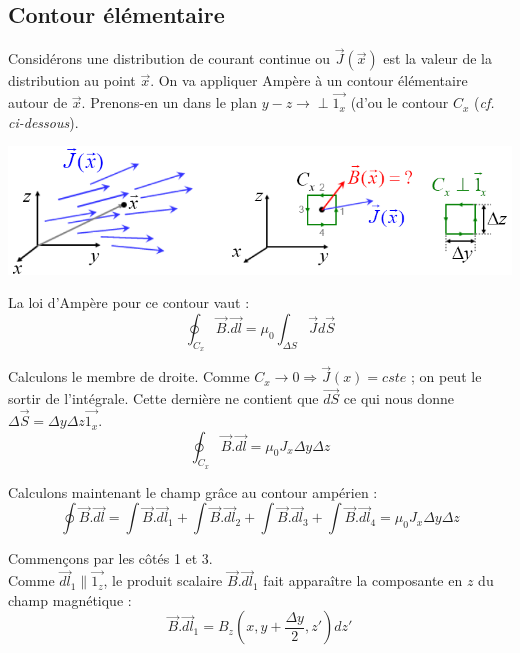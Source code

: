 \documentclass	[11pt, a4paper, openany]{book}
\begin{document}
\subsection{Contour élémentaire}
Considérons une distribution de courant continue ou $\vec{J}(\vec{x})$ est la valeur de la distribution au point $\vec{x}$. On va appliquer Ampère à un contour élémentaire autour de $\vec{x}$. Prenons-en un dans le plan $y-z \rightarrow \perp \vec{1_x}$ (d'ou le contour $C_x$ (\textit{cf. ci-dessous}).
\begin{center}
	\includegraphics[scale=0.60]{magneto/image16.png}
\end{center}
La loi d'Ampère pour ce contour vaut : 
\begin{equation}
	\oint_{C_x} \vec{B}.\vec{dl} = \mu_0\int_{\Delta S} \vec{J}d\vec{S}
\end{equation}

Calculons le membre de droite. Comme $C_x \rightarrow 0 \Rightarrow \vec{J}(x) = cste$ ; on peut le sortir de l'intégrale. Cette dernière ne contient que $\vec{dS}$ ce qui nous donne $\Delta \vec{S} = \Delta y\Delta z \vec{1_x}$.
\begin{equation}
	\oint_{C_x} \vec{B}.\vec{dl} = \mu_0J_x \Delta y\Delta z
\end{equation}

Calculons maintenant le champ grâce au contour ampérien :
\begin{equation}
	\oint \vec{B}.\vec{dl} = \int \vec{B}.\vec{dl}_1 + \int \vec{B}.\vec{dl}_2 + \int \vec{B}.\vec{dl}_3 + \int \vec{B}.\vec{dl}_4 = \mu_0J_x \Delta y\Delta z
\end{equation}

Commençons par les côtés 1 et 3.\\
Comme $\vec{dl}_1 \parallel \vec{1_z}$, le produit scalaire $\vec{B}.\vec{dl}_1$ fait apparaître la composante en $z$ du champ magnétique :
\begin{equation}
	\vec{B}.\vec{dl}_1 = B_z(x, y + \frac{\Delta y}{2}, z')dz'
\end{equation}
\end{document}
